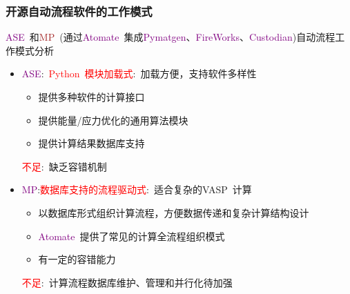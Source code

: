 \documentclass[cjk,slidestop,handout,compress,mathserif,blue]{beamer}	%
\begin{document}
%
%
\frame
{
	\frametitle{开源自动流程软件的工作模式}
	\textcolor{purple}{\textrm{ASE~}}和\textcolor{brown}{\textrm{MP~}}(通过\textcolor{purple}{\textrm{Atomate}~}集成\textcolor{purple}{\textrm{Pymatgen}}、\textcolor{purple}{\textrm{FireWorks}}、\textcolor{purple}{\textrm{Custodian}})自动流程工作模式分析
	\begin{itemize}
		\item \textcolor{purple}{\textrm{ASE}}:~\textcolor{red}{\textrm{Python~}模块加载式}:~加载方便，支持软件多样性
			\begin{itemize}
				\item 提供多种软件的计算接口
				\item 提供能量/应力优化的通用算法模块
				\item 提供计算结果数据库支持
			\end{itemize}
				\textcolor{red}{不足}:~缺乏容错机制
		\item \textcolor{purple}{\textrm{MP}}:\textcolor{red}{数据库支持的流程驱动式}:~适合复杂的\textrm{VASP~}计算
			\begin{itemize}
				\item 以数据库形式组织计算流程，方便数据传递和复杂计算结构设计
				\item \textcolor{purple}{\textrm{Atomate}~}提供了常见的计算全流程组织模式
				\item 有一定的容错能力
			\end{itemize}
				\textcolor{red}{不足}:~计算流程数据库维护、管理和并行化待加强
	\end{itemize}
}
\end{document}
